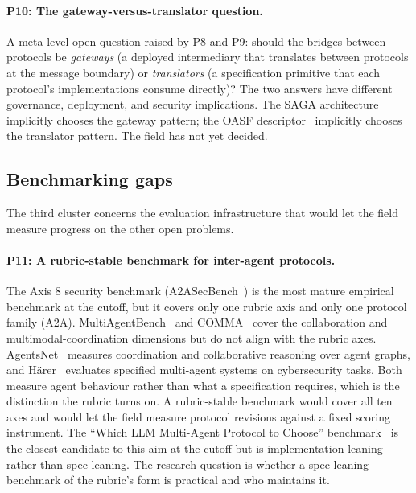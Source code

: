 \paragraph{P10: The gateway-versus-translator
question.}
A meta-level open question raised by P8 and P9: should
the bridges between protocols be \emph{gateways} (a
deployed intermediary that translates between
protocols at the message boundary) or \emph{translators}
(a specification primitive that each protocol's
implementations consume directly)? The two answers
have different governance, deployment, and security
implications. The SAGA architecture~\cite{saga2026}
implicitly chooses the gateway pattern; the OASF
descriptor~\cite{spec_agntcy} implicitly chooses the
translator pattern. The field has not yet decided.

\subsection{Benchmarking gaps}
\label{sec:openproblems:benchmarking}

The third cluster concerns the evaluation
infrastructure that would let the field measure
progress on the other open problems.

\paragraph{P11: A rubric-stable benchmark for
inter-agent protocols.}
The Axis 8 security benchmark
(A2ASecBench~\cite{a2asecbench}) is the most mature
empirical benchmark at the cutoff, but it covers
only one rubric axis and only one protocol family
(A2A). MultiAgentBench~\cite{multiagentbench} and
COMMA~\cite{comma_tmlr25} cover the collaboration
and multimodal-coordination dimensions but do not
align with the rubric axes.
AgentsNet~\cite{agentsnet} measures coordination and
collaborative reasoning over agent graphs, and
H\"arer~\cite{spec_eval_cyber} evaluates specified
multi-agent systems on cybersecurity tasks. Both
measure agent behaviour rather than what a
specification requires, which is the distinction the
rubric turns on. A rubric-stable
benchmark would cover all ten axes and would let
the field measure protocol revisions against a
fixed scoring instrument. The ``Which LLM
Multi-Agent Protocol to Choose''
benchmark~\cite{protocolbench} is the closest
candidate to this aim at the cutoff but is
implementation-leaning rather than spec-leaning.
The research question is whether a spec-leaning
benchmark of the rubric's form is practical and
who maintains it.

